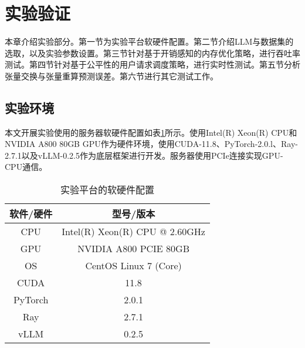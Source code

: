 \section{实验验证}

本章介绍实验部分。第一节为实验平台软硬件配置。第二节介绍LLM与数据集的选取，以及实验参数设置。第三节针对基于开销感知的内存优化策略，进行吞吐率测试。第四节针对基于公平性的用户请求调度策略，进行实时性测试。第五节分析张量交换与张量重算预测误差。第六节进行其它测试工作。

\subsection{实验环境}

本文开展实验使用的服务器软硬件配置如表\ref{Table:实验平台的软硬件配置}所示。使用Intel(R) Xeon(R) CPU和NVIDIA A800 80GB GPU作为硬件环境，使用CUDA-11.8、PyTorch-2.0.l、Ray-2.7.1以及vLLM-0.2.5作为底层框架进行开发。服务器使用PCIe连接实现GPU-CPU通信。

\begin{table}[H]
  \centering
  \caption{实验平台的软硬件配置}
  \label{Table:实验平台的软硬件配置}
  \renewcommand{\arraystretch}{1.3}
  \small
  \begin{tabular}{c c}
    \toprule
    \textbf{软件/硬件} & \textbf{型号/版本} \\ 
    \midrule
    CPU & Intel(R) Xeon(R) CPU @ 2.60GHz  \\ 
    GPU & NVIDIA A800 PCIE 80GB \\ 
    OS & CentOS Linux 7 (Core) \\ 
    CUDA & 11.8 \\ 
    PyTorch & 2.0.1 \\ 
    Ray & 2.7.1 \\
    vLLM & 0.2.5 \\ 
    \bottomrule
  \end{tabular}
\end{table}


